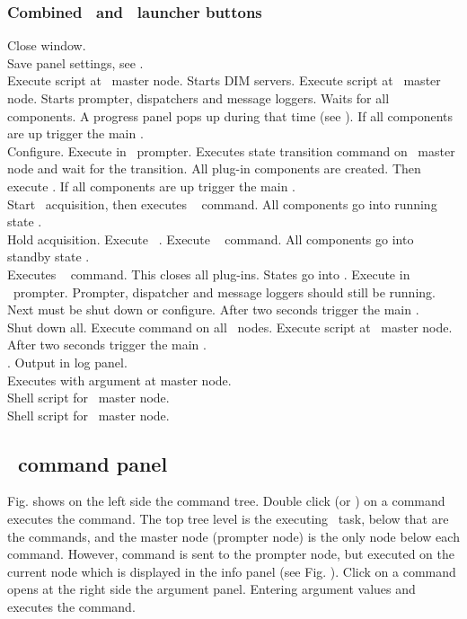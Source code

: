{\subsubsection[Combined DABC and MBS launcher buttons]{Combined \dabc\ and \mbs\ launcher buttons}
 Close window.\\
 Save panel settings, see .\\
  Execute script  at \dabc\ master node.
Starts DIM servers.
Execute script  at \mbs\ master node.
Starts prompter, dispatchers and message loggers.
Waits for all components.
A progress panel pops up during that time
(see ).
If all components are up trigger the main .\\
 Configure. Execute  in \mbs\ prompter.
Executes state transition command 
on \dabc\ master node and wait for the transition.
All plug-in components are created. Then execute .
If all components are up trigger the main .\\
 Start \mbs\ acquisition, then executes \dabc\  command.
All components go into running state .\\
 Hold acquisition. Execute \mbs\ .
Execute \dabc\  command.
All components go into standby state .\\
 Executes \dabc\  command.
This closes all plug-ins. States go into . 
Execute  in \mbs\ prompter.
Prompter, dispatcher and message loggers should still be running.
Next must be shut down or configure.
After two seconds trigger the main .\\
 Shut down all. Execute  command on all \dabc\ nodes.
Execute script  at \mbs\ master node.
After two seconds trigger the main .\\
 . Output in log panel.\\
 Executes  with argument  at master node.\\
 Shell script for \mbs\ master node.\\
 Shell script for \dabc\ master node.
\subsection[MBS command panel]{\mbs\ command panel}
Fig.  shows
on the left side the command tree. Double click (or ) on a command
executes the command. The top tree level is the executing \mbs\ task,
below that are the commands, and the master node (prompter node) is the only node
below each command. However,
command is sent to the prompter node, but executed on the current node 
which is displayed in the info panel
(see Fig. ).
Click on a command opens at the right side the argument panel.
Entering argument values and  executes the command.
}
